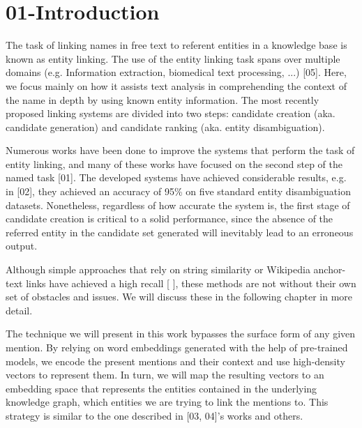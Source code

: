 \chapter{01-Introduction}
\label{ch:introduction}


The task of linking names in free text to referent entities in a knowledge base is known as entity linking. The use of the entity linking task spans over multiple domains (e.g. Information extraction, biomedical text processing, ...) [05]. Here, we focus mainly on how it assists text analysis in comprehending the context of the name in depth by using known entity information. The most recently proposed linking systems are divided into two steps: candidate creation (aka. candidate generation) and candidate ranking (aka. entity disambiguation).\newline

Numerous works have been done to improve the systems that perform the task of entity linking, and many of these works have focused on the second step of the named task [01]. The developed systems have achieved considerable results, e.g. in [02], they achieved an accuracy of 95\% on five standard entity disambiguation datasets.\newline
Nonetheless, regardless of how accurate the system is, the first stage of candidate creation is critical to a solid performance, since the absence of the referred entity in the candidate set generated will inevitably lead to an erroneous output.\newline

Although simple approaches that rely on string similarity or Wikipedia anchor-text links have achieved a high recall [ ], these methods are not without their own set of obstacles and issues. We will discuss these in the following chapter in more detail.\newline

The technique we will present in this work bypasses the surface form of any given mention. By relying on word embeddings generated with the help of pre-trained models, we encode the present mentions and their context and use high-density vectors to represent them. \newline
In turn, we will map the resulting vectors to an embedding space that represents the entities contained in the underlying knowledge graph, which entities we are trying to link the mentions to. This strategy is similar to the one described in [03, 04]'s works and others. \newpage

